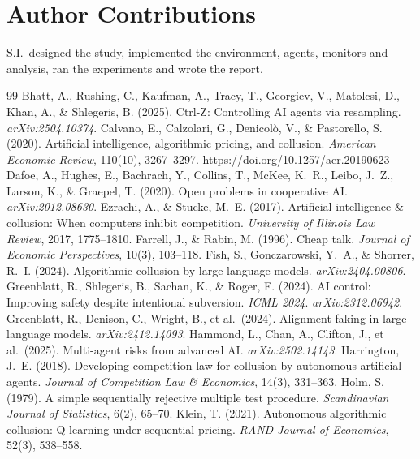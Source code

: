 \documentclass[11pt,letterpaper]{article}
\begin{document}
\section*{Author Contributions}
S.I.\ designed the study, implemented the environment, agents, monitors and analysis, ran the experiments and wrote the report.

\renewcommand{\refname}{References}
\begin{thebibliography}{99}
\small
{} Bhatt, A., Rushing, C., Kaufman, A., Tracy, T., Georgiev, V., Matolcsi, D., Khan, A., \& Shlegeris, B. (2025). Ctrl-Z: Controlling AI agents via resampling. \emph{arXiv:2504.10374}.
 Calvano, E., Calzolari, G., Denicol\`o, V., \& Pastorello, S. (2020). Artificial intelligence, algorithmic pricing, and collusion. \emph{American Economic Review}, 110(10), 3267--3297. \url{https://doi.org/10.1257/aer.20190623}
 Dafoe, A., Hughes, E., Bachrach, Y., Collins, T., McKee, K.~R., Leibo, J.~Z., Larson, K., \& Graepel, T. (2020). Open problems in cooperative AI. \emph{arXiv:2012.08630}.
 Ezrachi, A., \& Stucke, M.~E. (2017). Artificial intelligence \& collusion: When computers inhibit competition. \emph{University of Illinois Law Review}, 2017, 1775--1810.
 Farrell, J., \& Rabin, M. (1996). Cheap talk. \emph{Journal of Economic Perspectives}, 10(3), 103--118.
 Fish, S., Gonczarowski, Y.~A., \& Shorrer, R.~I. (2024). Algorithmic collusion by large language models. \emph{arXiv:2404.00806}.
 Greenblatt, R., Shlegeris, B., Sachan, K., \& Roger, F. (2024). AI control: Improving safety despite intentional subversion. \emph{ICML 2024}. \emph{arXiv:2312.06942}.
 Greenblatt, R., Denison, C., Wright, B., et al.\ (2024). Alignment faking in large language models. \emph{arXiv:2412.14093}.
 Hammond, L., Chan, A., Clifton, J., et al.\ (2025). Multi-agent risks from advanced AI. \emph{arXiv:2502.14143}.
 Harrington, J.~E. (2018). Developing competition law for collusion by autonomous artificial agents. \emph{Journal of Competition Law \& Economics}, 14(3), 331--363.
 Holm, S. (1979). A simple sequentially rejective multiple test procedure. \emph{Scandinavian Journal of Statistics}, 6(2), 65--70.
 Klein, T. (2021). Autonomous algorithmic collusion: Q-learning under sequential pricing. \emph{RAND Journal of Economics}, 52(3), 538--558.

\end{thebibliography}
\end{document}
